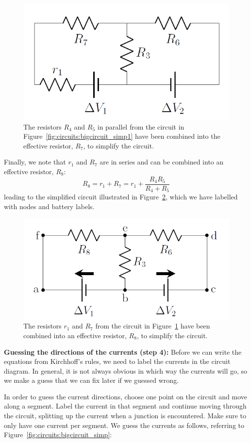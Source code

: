\begin{figure}[!htbp]
\centering
\includegraphics[width=0.42\linewidth]{files/bigcircuit_simp2-99756f76f2fb3356a4713b80fb3fb893.png}
\caption[]{The resistors $R_4$ and $R_5$ in parallel from the circuit in Figure~\ref{fig:circuits:bigcircuit_simp1} have been combined into the effective resistor, $R_7$, to simplify the circuit.}
\label{fig:circuits:bigcircuit_simp2}
\end{figure}

Finally, we note that $r_1$ and $R_7$ are in series and can be combined into an effective resistor, $R_8$:
\begin{equation}
R_8=r_1+R_7=r_1+\frac{R_4R_5}{R_4+R_5}
\end{equation}
leading to the simplified circuit illustrated in Figure~\ref{fig:circuits:bigcircuit_simp3}, which we have labelled with nodes and battery labels.

\begin{figure}[!htbp]
\centering
\includegraphics[width=0.45\linewidth]{files/bigcircuit_simp3-52981a5029c13508d012c4743b946805.png}
\caption[]{The resistors $r_1$ and $R_7$ from the circuit in Figure~\ref{fig:circuits:bigcircuit_simp2} have been combined into an effective resistor, $R_8$, to simplify the circuit.}
\label{fig:circuits:bigcircuit_simp3}
\end{figure}

\textbf{Guessing the directions of the currents (step 4):} Before we can write the equations from Kirchhoff's rules, we need to label the currents in the circuit diagram. In general, it is not always obvious in which way the currents will go, so we make a guess that we can fix later if we guessed wrong.

In order to guess the current directions, choose one point on the circuit and move along a segment. Label the current in that segment and continue moving through the circuit, splitting up the current when a junction is encountered. Make sure to only have one current per segment. We guess the currents as follows, referring to Figure~\ref{fig:circuits:bigcircuit_simp}:

